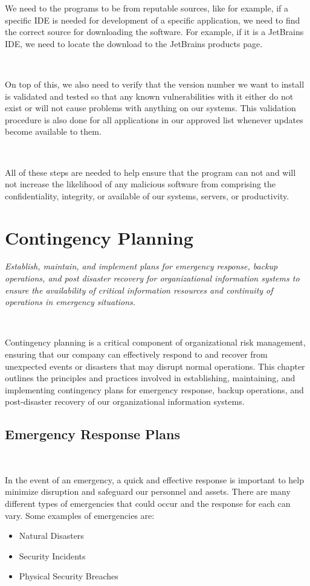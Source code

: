 \documentclass[12pt,a4paper]{report}
\begin{document}
We need to the programs to be from reputable sources, like for example, if a specific IDE is needed for development of a specific application, we need to find the correct source for downloading the software.
For example, if it is a JetBrains IDE, we need to locate the download to the JetBrains products page.

\

On top of this, we also need to verify that the version number we want to install is validated and tested so that any known vulnerabilities with it either do not exist or will not cause problems with anything on our systems.
This validation procedure is also done for all applications in our approved list whenever updates become available to them.

\

All of these steps are needed to help ensure that the program can not and will not increase the likelihood of any malicious software from comprising the confidentiality, integrity, or available of our systems, servers, or productivity.

\chapter{Contingency Planning}
\textit{Establish, maintain, and implement plans for emergency response, backup operations, and post disaster recovery for organizational information systems to ensure the availability of critical information resources and continuity of operations in emergency situations.}

\

Contingency planning is a critical component of organizational risk management, ensuring that our company can effectively respond to and recover from unexpected events or disasters that may disrupt normal operations.
This chapter outlines the principles and practices involved in establishing, maintaining, and implementing contingency plans for emergency response, backup operations, and post-disaster recovery of our organizational information systems.

\section{Emergency Response Plans}
\

In the event of an emergency, a quick and effective response is important to help minimize disruption and safeguard our personnel and assets.
There are many different types of emergencies that could occur and the response for each can vary.
Some examples of emergencies are:
\begin{itemize}
 \item Natural Disasters
 \item Security Incidents
 \item Physical Security Breaches
\end{itemize}
\end{document}
